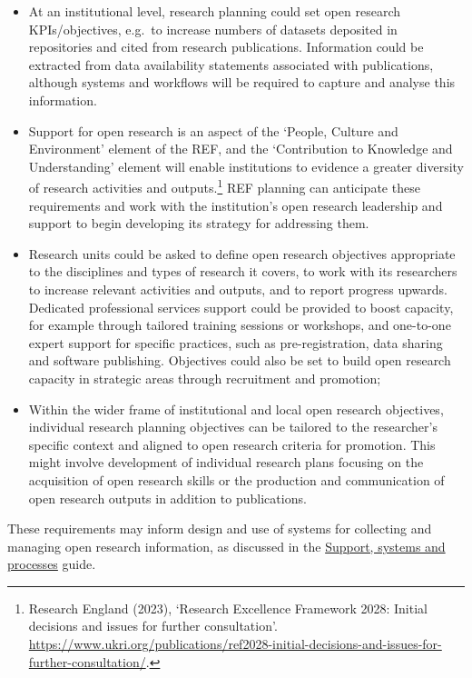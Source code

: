 \documentclass[
  letterpaper,
  DIV=11,
  numbers=noendperiod,
  oneside]{scrreprt}
\begin{document}
\begin{itemize}
\item
  At an institutional level, research planning could set open research
  KPIs/objectives, e.g.~to increase numbers of datasets deposited in
  repositories and cited from research publications. Information could
  be extracted from data availability statements associated with
  publications, although systems and workflows will be required to
  capture and analyse this information.
\item
  Support for open research is an aspect of the `People, Culture and
  Environment' element of the REF, and the `Contribution to Knowledge
  and Understanding' element will enable institutions to evidence a
  greater diversity of research activities and outputs.\footnote{Research
    England (2023), `Research Excellence Framework 2028: Initial
    decisions and issues for further consultation'.
    \url{https://www.ukri.org/publications/ref2028-initial-decisions-and-issues-for-further-consultation/}.}
  REF planning can anticipate these requirements and work with the
  institution's open research leadership and support to begin developing
  its strategy for addressing them.
\item
  Research units could be asked to define open research objectives
  appropriate to the disciplines and types of research it covers, to
  work with its researchers to increase relevant activities and outputs,
  and to report progress upwards. Dedicated professional services
  support could be provided to boost capacity, for example through
  tailored training sessions or workshops, and one-to-one expert support
  for specific practices, such as pre-registration, data sharing and
  software publishing. Objectives could also be set to build open
  research capacity in strategic areas through recruitment and
  promotion;
\item
  Within the wider frame of institutional and local open research
  objectives, individual research planning objectives can be tailored to
  the researcher's specific context and aligned to open research
  criteria for promotion. This might involve development of individual
  research plans focusing on the acquisition of open research skills or
  the production and communication of open research outputs in addition
  to publications.
\end{itemize}

These requirements may inform design and use of systems for collecting
and managing open research information, as discussed in the
\href{guide-06-support.qmd}{Support, systems and processes} guide.
\end{document}
